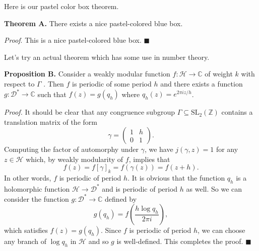 \documentclass[11pt,oneside]{article}
\begin{document}
 

Here is our pastel color box theorem.

\begin{myAwesomeBox}
    \textbf{Theorem A.} There exists a nice pastel-colored blue box.
\end{myAwesomeBox}

\begin{anotherAwesomeBox}
    \textit{Proof}. This is a nice pastel-colored blue box. $\blacksquare$
\end{anotherAwesomeBox}

\medskip

Let's try an actual theorem which has some use in number theory.

\begin{myAwesomeBox}
    \textbf{Proposition B.} Consider a weakly modular function $ f: \mathcal{H} \to \mathbb{C} $ of weight $ k $ with respect to $ \Gamma $ . Then $ f $ is periodic of some period $ h $ and there exists a function $ g: \mathcal{D^*} \to \mathbb{C} $ such that $ f(z) = g(q_h) $ where $ q_h(z) = e^{2 \pi i z/h} $.
\end{myAwesomeBox}

\begin{proofBox}
    \textit{Proof.} It should be clear that any congruence subgroup $ \Gamma \subseteq \mathrm{SL}_2(\mathbb{Z}) $ contains a translation matrix of the form
    \[
       \gamma = \begin{pmatrix}
           1 & h \\
           0 & 1
       \end{pmatrix}.
    \]
    Computing the factor of automorphy under $ \gamma $, we have $ j(\gamma, z) = 1 $ for any $ z \in \mathcal{H} $ which, by weakly modularity of $ f $, implies that
    \[
       f(z) = f[\gamma]_k = f(\gamma(z)) = f(z + h).
    \]
    In other words, $ f $ is periodic of period $ h $. It is obvious that the function $ q_h $ is a holomorphic function $ \mathcal{H} \to \mathcal{D^*} $ and is periodic of period $ h $ as well. So we can consider the function $ g: \mathcal{D^*} \to \mathbb{C} $ defined by
    \[
       g(q_h) = f \left( \frac{h \log q_h}{2 \pi i} \right),
    \]
    which satisfies $ f(z) = g(q_h) $. Since $ f $ is periodic of period $ h $, we can choose any branch of $ \log q_h $ in $ \mathcal{H} $ and so $ g $ is well-defined. This completes the proof. $ \blacksquare$
\end{proofBox}
\end{document}
